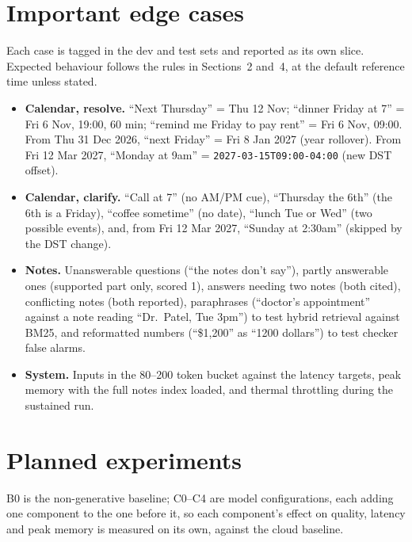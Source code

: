 \documentclass[10pt,letterpaper]{article}
\begin{document}
\section{Important edge cases}
Each case is tagged in the dev and test sets and reported as its own slice. Expected behaviour follows the rules in Sections~2 and~4, at the default reference time unless stated.
\begin{itemize}
  \item \textbf{Calendar, resolve.} ``Next Thursday'' = Thu 12 Nov; ``dinner Friday at 7'' = Fri 6 Nov, 19:00, 60 min; ``remind me Friday to pay rent'' = Fri 6 Nov, 09:00. From Thu 31 Dec 2026, ``next Friday'' = Fri 8 Jan 2027 (year rollover). From Fri 12 Mar 2027, ``Monday at 9am'' = \texttt{2027-03-15T09:00-04:00} (new DST offset).
  \item \textbf{Calendar, clarify.} ``Call at 7'' (no AM/PM cue), ``Thursday the 6th'' (the 6th is a Friday), ``coffee sometime'' (no date), ``lunch Tue or Wed'' (two possible events), and, from Fri 12 Mar 2027, ``Sunday at 2:30am'' (skipped by the DST change).
  \item \textbf{Notes.} Unanswerable questions (``the notes don't say''), partly answerable ones (supported part only, scored 1), answers needing two notes (both cited), conflicting notes (both reported), paraphrases (``doctor's appointment'' against a note reading ``Dr.\ Patel, Tue 3pm'') to test hybrid retrieval against BM25, and reformatted numbers (``\$1,200'' as ``1200 dollars'') to test checker false alarms.
  \item \textbf{System.} Inputs in the 80--200 token bucket against the latency targets, peak memory with the full notes index loaded, and thermal throttling during the sustained run.
\end{itemize}

\section{Planned experiments}
B0 is the non-generative baseline; C0--C4 are model configurations, each adding one component to the one before it, so each component's effect on quality, latency and peak memory is measured on its own, against the cloud baseline.
\end{document}
